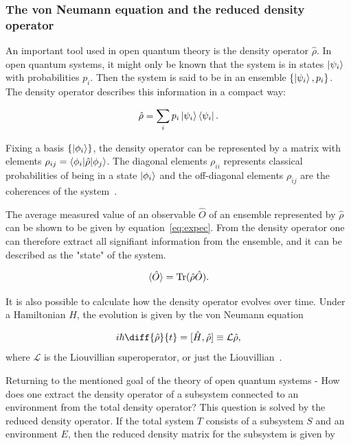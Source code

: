 \documentclass[../main.tex]{subfiles}
\begin{document}
\subsubsection{The von Neumann equation and the reduced density operator}

An important tool used in open quantum theory is the density operator $\hat{\rho}$. In open quantum systems, it might only be known that the system is in states $\ket{\psi_i}$ with probabilities $p_i$. Then the system is said to be in an ensemble $\{\ket{\psi_i}, p_i\}$. The density operator describes this information in a compact way:

\begin{equation}
    \hat{\rho} = \sum_i p_i \ket{\psi_i}\bra{\psi_i}.
\end{equation}

Fixing a basis $\{\ket{\phi_i}\}$, the density operator can be represented by a matrix with elements $\rho_{ij} = \braket{\phi_i|\hat\rho|\phi_j}$. The diagonal elements $\rho_{ii}$ represents classical probabilities of being in a state $\ket{\phi_i}$ and the off-diagonal elements $\rho_{ij}$ are the coherences of the system~\cite{bookopen}.

The average measured value of an observable $\hat O$ of an ensemble represented by $\hat\rho$ can be shown to be given by equation~\eqref{eq:expec}. From the density operator one can therefore extract all signifiant information from the ensemble, and it can be described as the "state" of the system.

\begin{equation}\label{eq:expec}
    \braket{\hat O} = \operatorname{Tr}({\hat\rho \hat O}).
\end{equation}

It is also possible to calculate how the density operator evolves over time. Under a Hamiltonian $\hat H$, the evolution is given by the von Neumann equation

\begin{equation}\label{vonneumann}
    i\hbar\diff{\hat\rho}{t} = [\hat H, \hat\rho] \equiv \mathcal{L}\hat\rho,
\end{equation}
where $\mathcal{L}$ is the Liouvillian superoperator, or just the Liouvillian~\cite{bookopen}. 

Returning to the mentioned goal of the theory of open quantum systems - How does one extract the density operator of a subsystem connected to an environment from the total density operator? This question is solved by the reduced density operator. If the total system $T$ consists of a subsystem $S$ and an environment $E$, then the reduced density matrix for the subsystem is given by
\end{document}
